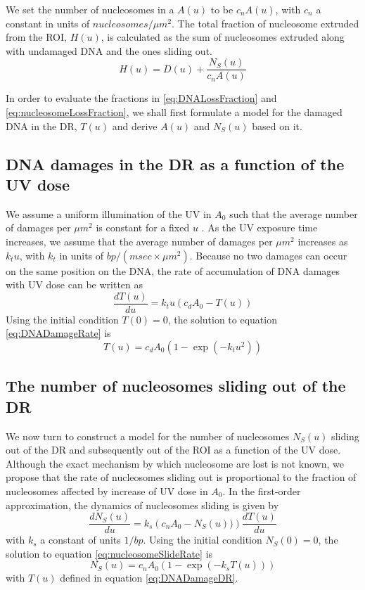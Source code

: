 \documentclass[12pt]{article}
\begin{document}
	We set the number of nucleosomes in a $A(u)$ to be $c_nA(u)$, with $c_n$ a constant in units of $nucleosomes/\mu m^2$. The total fraction of nucleosome extruded from the ROI, $H(u)$, is calculated as the sum of nucleosomes extruded along with undamaged DNA and the ones sliding out.
	\begin{equation}\label{eq:nucleosomeLossFraction}
	H(u) = D(u) + \frac{N_S(u)}{c_nA(u)}	
	\end{equation}
	
	In order to evaluate the fractions in \eqref{eq:DNALossFraction} and \eqref{eq:nucleosomeLossFraction}, we shall first formulate a model for the damaged DNA in the DR, $T(u)$ and derive $A(u)$ and $N_S(u)$ based on it.
	
	\subsection{DNA damages in the DR as a function of the UV dose}\label{subsection:AccumulationOfDNADamagesInTheDR}
	 We assume a uniform illumination of the UV in $A_0$ such that the average number of damages per $\mu m^2$ is constant for a fixed $u$ . As the UV exposure time increases, we assume that the average number of damages per $\mu m^2$ increases as $k_tu$, with $k_t$ in units of $bp/(msec\times \mu m^2)$. Because no two damages can occur on the same position on the DNA, the rate of accumulation of DNA damages with UV dose can be written as
	\begin{equation}\label{eq:DNADamageRate}
	\frac{dT(u)}{du} = k_tu(c_dA_0 - T(u))
	\end{equation}	
	 Using the initial condition $T(0) = 0$, the solution to equation \eqref{eq:DNADamageRate} is
	\begin{equation}\label{eq:DNADamageDR}
		T(u) = c_dA_0(1-\exp(-k_tu^2))
	\end{equation}
	
	\subsection{The number of nucleosomes sliding out of the DR}
	We now turn to construct a model for the number of nucleosomes $N_S(u)$
	sliding out of the DR and subsequently out of the ROI as a function of the UV dose. Although the exact mechanism by which nucleosome are lost is not known, 
	we propose that the rate of nucleosomes sliding out is proportional to the fraction of nucleosomes affected by increase of UV dose in $A_0$. In the first-order approximation, the dynamics of nucleosomes sliding is given by
	\begin{equation}\label{eq:nucleosomeSlideRate}
	\frac{dN_S(u)}{du} = k_s\left(c_nA_0-N_S(u))\right)\frac{dT(u)}{du}	 
	\end{equation}
	with $k_s$ a constant of units $1/bp$. Using the initial condition $N_S(0)=0$, the solution to equation \eqref{eq:nucleosomeSlideRate} is 
	\begin{equation}\label{eq:nucleosomeSlideDR}
	N_S(u)= c_nA_0\left(1-\exp(-k_sT(u))\right)
	\end{equation}
	with $T(u)$ defined in equation \eqref{eq:DNADamageDR}.
\end{document}
